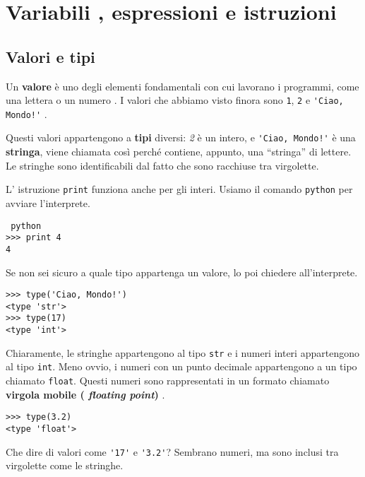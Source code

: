 % 
\chapter{Variabili , espressioni e istruzioni}

\section{Valori e tipi}   

Un \textbf{valore} \`{e} uno degli elementi fondamentali con cui
lavorano i programmi, come una lettera o un numero . I valori che
abbiamo visto finora sono {\tt 1}, {\tt 2} e \verb"'Ciao, Mondo!'" .

Questi valori appartengono a \textbf{tipi }diversi: \emph{2} \`{e} un
intero, e \verb"'Ciao, Mondo!'"  \`{e} una \textbf{stringa}, viene
chiamata cos\`{i} perch\'{e} contiene, appunto, una {``}stringa'' di
lettere. Le stringhe sono identificabili dal fatto che sono racchiuse
tra virgolette.

L' istruzione {\tt print} funziona anche per gli interi. Usiamo il
comando {\tt python} per avviare l'interprete.


\beforeverb \begin{verbatim} python
>>> print 4
4 \end{verbatim} \afterverb
%
Se non sei sicuro a quale tipo appartenga un valore, lo poi chiedere
all'interprete.

\beforeverb \begin{verbatim}
>>> type('Ciao, Mondo!')
<type 'str'>
>>> type(17)
<type 'int'> \end{verbatim} \afterverb
%
Chiaramente, le stringhe appartengono al tipo {\tt str} e i numeri
interi appartengono al tipo {\tt int}. Meno ovvio, i numeri con un punto
decimale appartengono a un tipo chiamato {\tt float}. Questi numeri sono
rappresentati in un formato chiamato \textbf{virgola mobile ({\em
floating point})} .

   
  

\beforeverb \begin{verbatim}
>>> type(3.2)
<type 'float'> \end{verbatim} \afterverb
%
%
Che dire di valori come \verb"'17'" e \verb"'3.2'"? Sembrano numeri, ma
sono inclusi tra virgolette come le stringhe.

